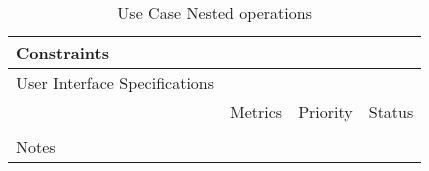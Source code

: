\begin{table}[H]
\begin{tabularx}{\linewidth}{|l|X|X|X|}
    \hline Constraints                   & \multicolumn{3}{l|}{}                                                                                 \\

    \hline User Interface Specifications & \multicolumn{3}{l|}{}                                                                                 \\

    \hline \multirow{2}{*}{}             & Metrics                                                                           & Priority & Status \\
    \cline{2-4}                          &                                                                                   &          &        \\
    \hline Notes                         & \multicolumn{3}{l|}{}                                                                                 \\
    \hline
  \end{tabularx}
  \caption{Use Case Nested operations}
  \label{tab:use_case_nested_operations}
\end{table}

